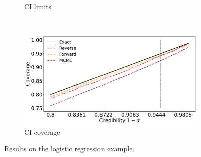 \begin{figure}[ht]
\begin{subfigure}{\linewidth}
    \caption{CI limits}
    \label{fig:logreg_lims}
    \end{subfigure}\\[1ex]
    \begin{subfigure}{\linewidth}
    \centering
    \includegraphics[width=0.8\linewidth]{fig/logreg_cicoverage.pdf}
    \caption{CI coverage}
    \label{fig:logreg_coverage}
    \end{subfigure}
    \caption{Results on the logistic regression example.}
    \label{fig:logreg}
\end{figure}